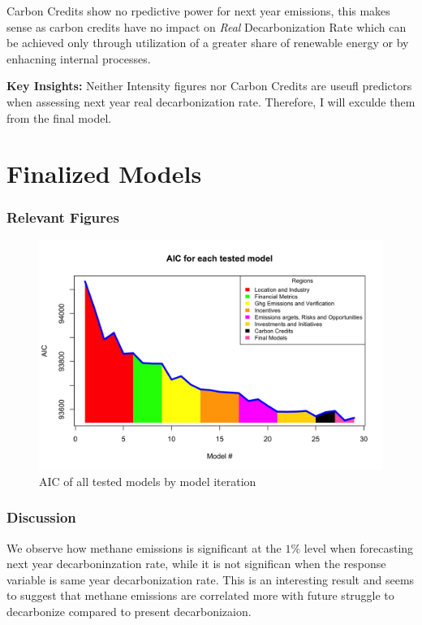 Carbon Credits show no rpedictive power for next year emissions, this makes sense as carbon credits have no impact on \textit{Real} Decarbonization Rate which can be achieved only through utilization of a greater share of renewable energy or by enhacning internal processes.

\textbf{Key Insights: } Neither Intensity figures nor Carbon Credits are useufl predictors when assessing next year real decarbonization rate. Therefore, I will exculde them from the final model.


\section{Finalized Models}



\subsubsection{Relevant Figures}

\begin{figure}[H]
    \centering
    \includegraphics[width=\linewidth]{../notebooks/R/aic.png}
    \caption{AIC of all tested models by model iteration}
    \label{AIC}
\end{figure}

\subsubsection{Discussion}
We observe how methane emissions is significant at the $1\%$ level when forecasting next year decarboninzation rate, while it is not significan when the response variable is same year decarbonization rate. This is an interesting result and seems to suggest that methane emissions are correlated more with future struggle to decarbonize compared to present decarbonizaion. 



